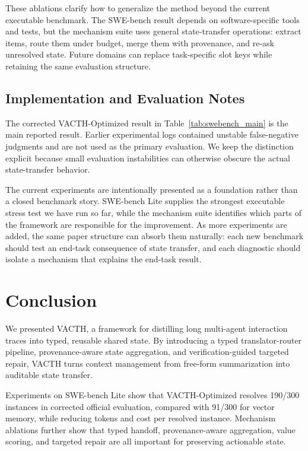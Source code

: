 \documentclass{article} %
\begin{document}
These ablations clarify how to generalize the method beyond the current executable benchmark. The SWE-bench result depends on software-specific tools and tests, but the mechanism suite uses general state-transfer operations: extract items, route them under budget, merge them with provenance, and re-ask unresolved state. Future domains can replace task-specific slot keys while retaining the same evaluation structure.

\subsection{Implementation and Evaluation Notes}

The corrected VACTH-Optimized result in Table~\ref{tab:swebench_main} is the main reported result. Earlier experimental logs contained unstable false-negative judgments and are not used as the primary evaluation. We keep the distinction explicit because small evaluation instabilities can otherwise obscure the actual state-transfer behavior.

The current experiments are intentionally presented as a foundation rather than a closed benchmark story. SWE-bench Lite supplies the strongest executable stress test we have run so far, while the mechanism suite identifies which parts of the framework are responsible for the improvement. As more experiments are added, the same paper structure can absorb them naturally: each new benchmark should test an end-task consequence of state transfer, and each diagnostic should isolate a mechanism that explains the end-task result.




\section{Conclusion}

We presented VACTH, a framework for distilling long multi-agent interaction traces into typed, reusable shared state. By introducing a typed translator-router pipeline, provenance-aware state aggregation, and verification-guided targeted repair, VACTH turns context management from free-form summarization into auditable state transfer.

Experiments on SWE-bench Lite show that VACTH-Optimized resolves 190/300 instances in corrected official evaluation, compared with 91/300 for vector memory, while reducing tokens and cost per resolved instance. Mechanism ablations further show that typed handoff, provenance-aware aggregation, value scoring, and targeted repair are all important for preserving actionable state.
\end{document}
